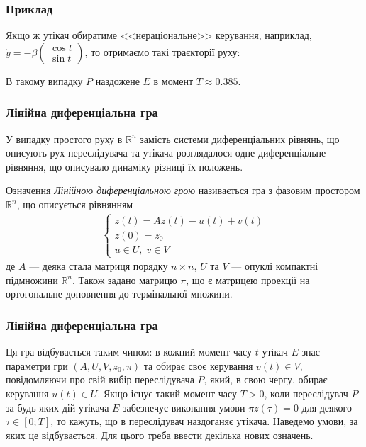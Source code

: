 \documentclass[10pt,pdf]{beamer}
\newcommand{\R}{\mathbb{R}}
\renewcommand{\d}[1]{\dot{#1}}
\renewcommand{\l}{\left}
\renewcommand{\r}{\right}
\begin{document}
    \begin{frame}
        \frametitle{Приклад}
        Якщо ж утікач обиратиме <<нераціональне>> керування, наприклад, $\d{y} = -\beta\begin{pmatrix}
            \cos t \\ \sin t
        \end{pmatrix}$, то отримаємо такі траєкторії руху:
        \begin{center}
            \resizebox{180pt}{!}{
                
            }
        \end{center}
        В такому випадку $P$ наздожене $E$ в момент $T \approx 0.385$.
    \end{frame}
    \begin{frame}
        \frametitle{Лінійна диференціальна гра}
        У випадку простого руху в $\R^n$ замість системи диференціальних рівнянь,
        що описують рух переслідувача та утікача розглядалося
        одне диференціальне рівняння, що описувало динаміку різниці їх положень.
        \begin{block}{Означення}
            \emph{Лінійною диференціальною грою} називається гра з фазовим простором
            $\R^n$, що описується рівнянням
            \begin{gather*}
                \begin{cases}
                    \d{z}(t) = A z(t) - u(t) + v(t) \\
                    z(0) = z_0 \\
                    u \in U, \; v \in V
                \end{cases}
            \end{gather*}
            де $A$ --- деяка стала матриця порядку $n\times n$, $U$ та $V$ --- опуклі компактні
            підмножини $\R^n$. Також задано матрицю $\pi$, що є матрицею проекції на ортогональне доповнення до термінальної множини.
        \end{block}
    \end{frame}
    \begin{frame}
        \frametitle{Лінійна диференціальна гра}
    
        Ця гра відбувається таким чином: в кожний момент часу $t$ утікач $E$ знає параметри гри
        $\l(A, U, V, z_0, \pi \r)$ та обирає своє керування $v(t) \in V$, повідомляючи про свій вибір
        переслідувача $P$, який, в свою чергу, обирає керування $u(t) \in U$.
        Якщо існує такий момент часу $T > 0$, коли переслідувач $P$ за будь-яких дій
        утікача $E$ забезпечує виконання умови $\pi z(\tau) = 0$ для деякого
        $\tau \in [0; T]$, то кажуть, що в переслідувач наздоганяє утікача.
        Наведемо умови, за яких це відбувається. Для цього треба ввести декілька нових означень.
    
    \end{frame}
\end{document}
